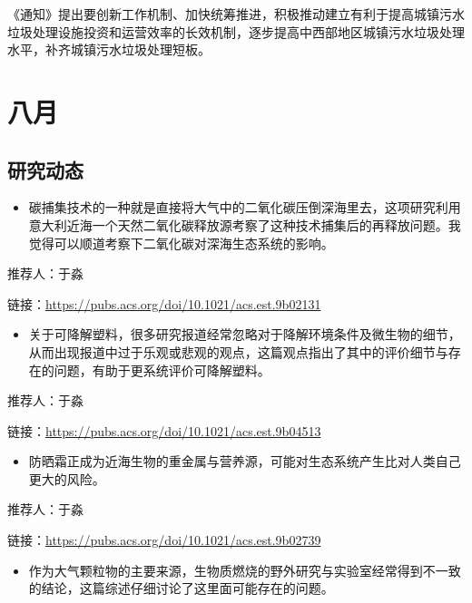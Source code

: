 \documentclass[]{book}
\providecommand{\tightlist}{%
  \setlength{\itemsep}{0pt}\setlength{\parskip}{0pt}}
\begin{document}
《通知》提出要创新工作机制、加快统筹推进，积极推动建立有利于提高城镇污水垃圾处理设施投资和运营效率的长效机制，逐步提高中西部地区城镇污水垃圾处理水平，补齐城镇污水垃圾处理短板。

\hypertarget{ux516bux6708-1}{%
\section*{八月}\label{ux516bux6708-1}}

\hypertarget{ux7814ux7a76ux52a8ux6001-21}{%
\subsection*{研究动态}\label{ux7814ux7a76ux52a8ux6001-21}}

\begin{itemize}
\tightlist
\item
  碳捕集技术的一种就是直接将大气中的二氧化碳压倒深海里去，这项研究利用意大利近海一个天然二氧化碳释放源考察了这种技术捕集后的再释放问题。我觉得可以顺道考察下二氧化碳对深海生态系统的影响。
\end{itemize}

推荐人：于淼

链接：\url{https://pubs.acs.org/doi/10.1021/acs.est.9b02131}

\begin{itemize}
\tightlist
\item
  关于可降解塑料，很多研究报道经常忽略对于降解环境条件及微生物的细节，从而出现报道中过于乐观或悲观的观点，这篇观点指出了其中的评价细节与存在的问题，有助于更系统评价可降解塑料。
\end{itemize}

推荐人：于淼

链接：\url{https://pubs.acs.org/doi/10.1021/acs.est.9b04513}

\begin{itemize}
\tightlist
\item
  防晒霜正成为近海生物的重金属与营养源，可能对生态系统产生比对人类自己更大的风险。
\end{itemize}

推荐人：于淼

链接：\url{https://pubs.acs.org/doi/10.1021/acs.est.9b02739}

\begin{itemize}
\tightlist
\item
  作为大气颗粒物的主要来源，生物质燃烧的野外研究与实验室经常得到不一致的结论，这篇综述仔细讨论了这里面可能存在的问题。
\end{itemize}
\end{document}
